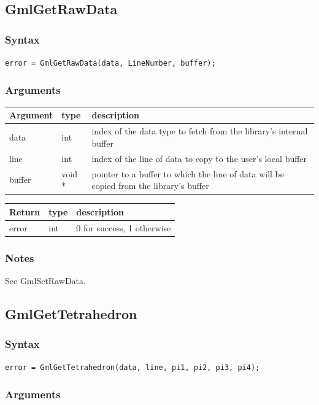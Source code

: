 \documentclass[a4paper,12pt]{article}
\begin{document}
\subsection{GmlGetRawData}
\subsubsection*{Syntax}
{\tt error = GmlGetRawData(data, LineNumber, buffer);}
\subsubsection*{Arguments}

\begin{tabular}{|m{2cm}|m{1.5cm}|m{10.5cm}|}
\hline
Argument   & type   & description \\
\hline
data       & int    & index of the data type to fetch from the library's internal buffer \\
\hline
line       & int    & index of the line of data to copy to the user's local buffer \\
\hline
buffer     & void * & pointer to a buffer to which the line of data will be copied from the library's buffer \\
\hline
\end{tabular}

\medskip

\begin{tabular}{|m{2cm}|m{1.5cm}|m{10.5cm}|}
\hline
Return     & type   & description \\
\hline
error     & int    & 0 for success, 1 otherwise \\
\hline
\end{tabular}
\subsubsection*{Notes}
See GmlSetRawData.


\subsection{GmlGetTetrahedron}
\subsubsection*{Syntax}
{\tt error = GmlGetTetrahedron(data, line, pi1, pi2, pi3, pi4);}
\subsubsection*{Arguments}
\end{document}
